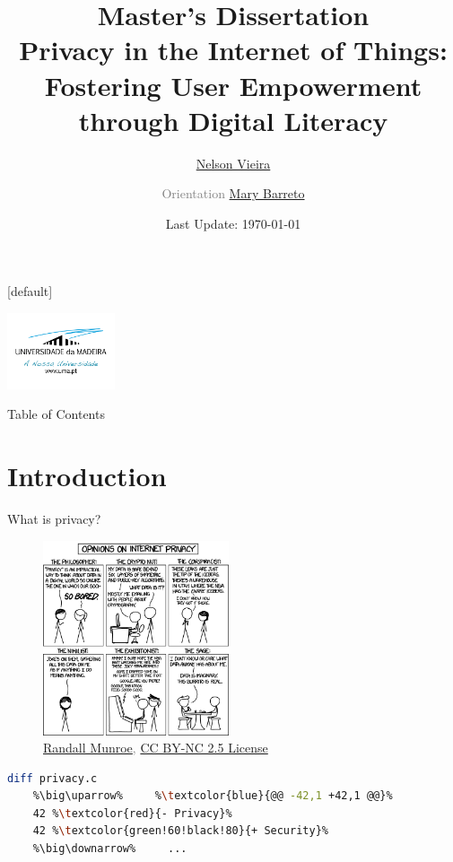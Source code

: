 \documentclass[xcolor={svgnames},compress,aspectratio=169]{beamer}
\title[Privacy in the Internet of Things: Fostering User Empowerment through Digital Literacy]{Master's Dissertation \\ {\normalsize Privacy in the Internet of Things: Fostering User Empowerment through Digital Literacy}}
\author{\href{mailto:2080511@student.uma.pt}{Nelson Vieira}\\
\and \textcolor{gray}{Orientation} \href{mailto:mary.barreto@staff.uma.pt}{Mary Barreto}
}
\institute[\href{https://www.uma.pt/}{University of Madeira}]{University of Madeira\\Faculty of Exact Sciences and Engineering}
\date{{\scriptsize Last Update: \today}}
\makeatletter
\newenvironment{withoutheadline}{
        \setbeamertemplate{headline}[default]
        \def\beamer@entrycode{\vspace*{-\headheight}}
    }{}
\makeatother
\begin{document}
\begin{withoutheadline}
    \begin{frame}
        \centering\includegraphics[width=90pt]{assets/images/uma_logo.png}
        \maketitle
    \end{frame}
\end{withoutheadline}

\begin{frame}{Table of Contents}
    \begin{multicols}{2}
        \tableofcontents
    \end{multicols}
\end{frame}

\section{Introduction}

\begin{frame}[fragile]
    \begin{multicols}{2}
        \centering
        {\footnotesize What is privacy?}
        \begin{figure}
            \centering\includegraphics[width=155pt]{assets/images/privacy_opinions.png}\\
            \textcolor{gray}{{\tiny \textcopyright \href{https://xkcd.com/1269/}{Randall Munroe}, \href{https://creativecommons.org/licenses/by-nc/2.5/}{CC BY-NC 2.5 License}}}
        \end{figure}

        \columnbreak
        \vspace*{\fill}
\begin{lstlisting}[language=sh,escapechar=\%]
    diff privacy.c
    %\big\uparrow%     %\textcolor{blue}{@@ -42,1 +42,1 @@}%
    42 %\textcolor{red}{- Privacy}%
    42 %\textcolor{green!60!black!80}{+ Security}%
    %\big\downarrow%     ...
\end{lstlisting}
        \vspace*{\fill}
    \end{multicols}
\end{frame}
\end{document}
